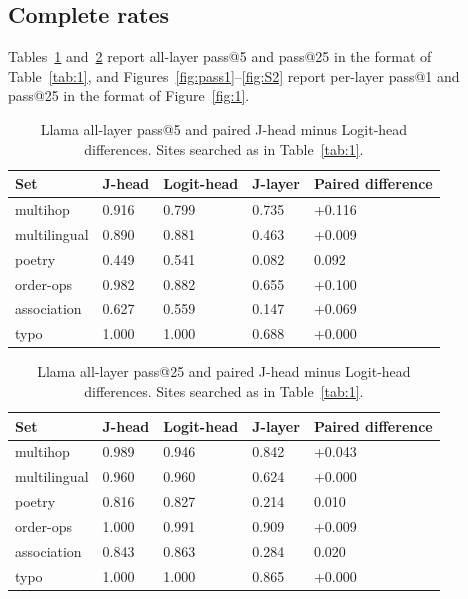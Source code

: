 \documentclass[11pt,a4paper]{article}
\begin{document}
\subsection{Complete rates}\label{sec:S2.3}

Tables~\ref{tab:pass5} and~\ref{tab:pass25} report all-layer pass@5 and pass@25 in the format of Table~\ref{tab:1}, and Figures~\ref{fig:pass1}--\ref{fig:S2} report per-layer pass@1 and pass@25 in the format of Figure~\ref{fig:1}.

\begin{table}[htbp]
\centering
\small
\setlength{\tabcolsep}{4pt}
\caption{Llama all-layer pass@5 and paired J-head minus Logit-head differences. Sites searched as in Table~\ref{tab:1}.}
\label{tab:pass5}
\begin{tabular}{@{}lllll@{}}
\toprule
Set & J-head & Logit-head & J-layer & Paired difference \\
\midrule
multihop & 0.916 & 0.799 & 0.735 & +0.116 \\
multilingual & 0.890 & 0.881 & 0.463 & +0.009 \\
poetry & 0.449 & 0.541 & 0.082 & \textminus{}0.092 \\
order-ops & 0.982 & 0.882 & 0.655 & +0.100 \\
association & 0.627 & 0.559 & 0.147 & +0.069 \\
typo & 1.000 & 1.000 & 0.688 & +0.000 \\
\bottomrule
\end{tabular}
\end{table}

\begin{table}[htbp]
\centering
\small
\setlength{\tabcolsep}{4pt}
\caption{Llama all-layer pass@25 and paired J-head minus Logit-head differences. Sites searched as in Table~\ref{tab:1}.}
\label{tab:pass25}
\begin{tabular}{@{}lllll@{}}
\toprule
Set & J-head & Logit-head & J-layer & Paired difference \\
\midrule
multihop & 0.989 & 0.946 & 0.842 & +0.043 \\
multilingual & 0.960 & 0.960 & 0.624 & +0.000 \\
poetry & 0.816 & 0.827 & 0.214 & \textminus{}0.010 \\
order-ops & 1.000 & 0.991 & 0.909 & +0.009 \\
association & 0.843 & 0.863 & 0.284 & \textminus{}0.020 \\
typo & 1.000 & 1.000 & 0.865 & +0.000 \\
\bottomrule
\end{tabular}
\end{table}
\end{document}

